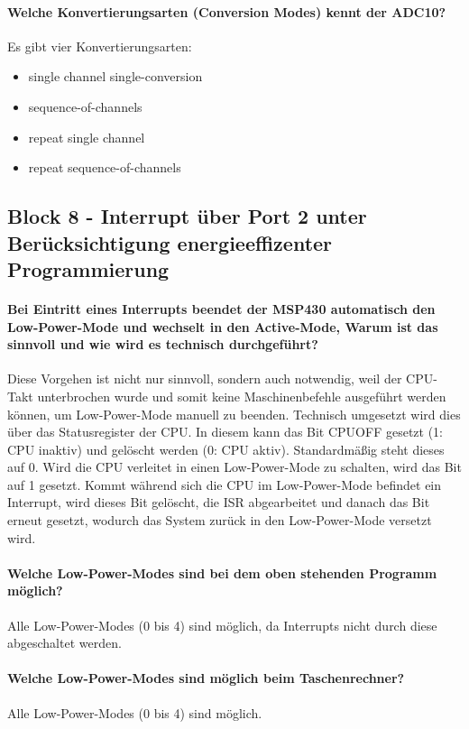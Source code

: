 \documentclass[12pt,a4paper,bibliography=totocnumbered,listof=totocnumbered]{scrartcl}
\begin{document}
\paragraph{Welche Konvertierungsarten (Conversion Modes) kennt der ADC10?}
Es gibt vier Konvertierungsarten:
\begin{itemize}
	\item single channel single-conversion
	\item sequence-of-channels
	\item repeat single channel
	\item repeat sequence-of-channels
\end{itemize}

\subsection{Block 8 - Interrupt über Port 2 unter Berücksichtigung energieeffizenter Programmierung}
\paragraph{Bei Eintritt eines Interrupts beendet der MSP430 automatisch den Low-Power-Mode und wechselt in den Active-Mode, Warum ist das sinnvoll und wie wird es technisch durchgeführt?} Diese Vorgehen ist nicht nur sinnvoll, sondern auch notwendig, weil der CPU-Takt unterbrochen wurde und somit keine Maschinenbefehle ausgeführt werden können, um Low-Power-Mode manuell zu beenden.
Technisch umgesetzt wird dies über das Statusregister der CPU. In diesem kann das Bit CPUOFF gesetzt (1: CPU inaktiv) und gelöscht werden (0: CPU aktiv). Standardmäßig steht dieses auf 0. Wird die CPU verleitet in einen Low-Power-Mode zu schalten, wird das Bit auf 1 gesetzt. Kommt während sich die CPU im Low-Power-Mode befindet ein Interrupt, wird dieses Bit gelöscht, die ISR abgearbeitet und danach das Bit erneut gesetzt, wodurch das System zurück in den Low-Power-Mode versetzt wird.

\paragraph{Welche Low-Power-Modes sind bei dem oben stehenden Programm möglich?} Alle Low-Power-Modes (0 bis 4) sind möglich, da Interrupts nicht durch diese abgeschaltet werden.

\paragraph{Welche Low-Power-Modes sind möglich beim Taschenrechner?} Alle Low-Power-Modes (0 bis 4) sind möglich.
\end{document}
